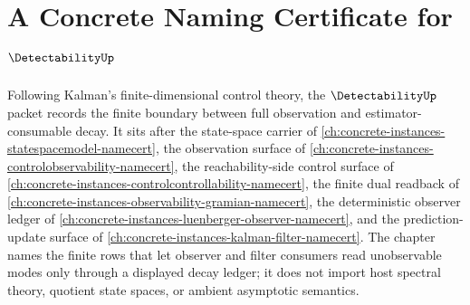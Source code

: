 \chapter{A Concrete Naming Certificate for $\DetectabilityUp$}
\label{ch:concrete-instances-detectability-namecert}

Following Kalman's finite-dimensional control theory, the $\DetectabilityUp$ packet records the finite boundary between full observation and estimator-consumable decay. It sits after the state-space carrier of \autoref{ch:concrete-instances-statespacemodel-namecert}, the observation surface of \autoref{ch:concrete-instances-controlobservability-namecert}, the reachability-side control surface of \autoref{ch:concrete-instances-controlcontrollability-namecert}, the finite dual readback of \autoref{ch:concrete-instances-observability-gramian-namecert}, the deterministic observer ledger of \autoref{ch:concrete-instances-luenberger-observer-namecert}, and the prediction-update surface of \autoref{ch:concrete-instances-kalman-filter-namecert}. The chapter names the finite rows that let observer and filter consumers read unobservable modes only through a displayed decay ledger; it does not import host spectral theory, quotient state spaces, or ambient asymptotic semantics.

